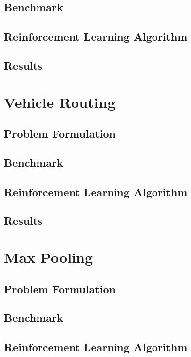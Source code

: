 \documentclass[12pt]{article}
\begin{document}
\subsection{Benchmark}

\subsection{Reinforcement Learning Algorithm}

\subsection{Results}

\section{Vehicle Routing}

\subsection{Problem Formulation}

\subsection{Benchmark}

\subsection{Reinforcement Learning Algorithm}

\subsection{Results}

\section{Max Pooling}

\subsection{Problem Formulation}

\subsection{Benchmark}

\subsection{Reinforcement Learning Algorithm}
\end{document}

